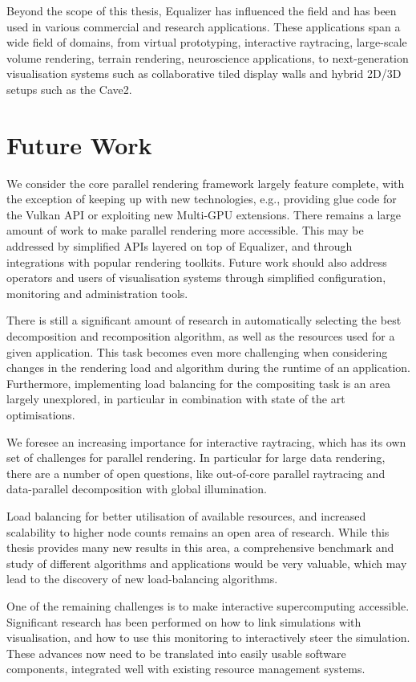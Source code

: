 Beyond the scope of this thesis, Equalizer has influenced the field and has
been used in various commercial and research applications. These applications
span a wide field of domains, from virtual prototyping, interactive raytracing,
large-scale volume rendering, terrain rendering, neuroscience applications, to
next-generation visualisation systems such as collaborative tiled display walls
and hybrid 2D/3D setups such as the Cave2.

\section{Future Work}

We consider the core parallel rendering framework largely feature complete,
with the exception of keeping up with new technologies, e.g., providing glue
code for the Vulkan API or exploiting new Multi-GPU extensions. There remains a
large amount of work to make parallel rendering more accessible. This may be
addressed by simplified APIs layered on top of Equalizer, and through
integrations with popular rendering toolkits. Future work should also address
operators and users of visualisation systems through simplified configuration,
monitoring and administration tools.

There is still a significant amount of research in automatically selecting the
best decomposition and recomposition algorithm, as well as the resources used
for a given application. This task becomes even more challenging when
considering changes in the rendering load and algorithm during the runtime of
an application. Furthermore, implementing load balancing for the compositing
task is an area largely unexplored, in particular in combination with state of
the art optimisations.

We foresee an increasing importance for interactive raytracing, which has its
own set of challenges for parallel rendering. In particular for large data
rendering, there are a number of open questions, like out-of-core parallel
raytracing and data-parallel decomposition with global illumination.

Load balancing for better utilisation of available resources, and increased
scalability to higher node counts remains an open area of research. While this
thesis provides many new results in this area, a comprehensive benchmark and
study of different algorithms and applications would be very valuable,
which may lead to the discovery of new load-balancing algorithms.

One of the remaining challenges is to make interactive supercomputing
accessible. Significant research has been performed on how to link simulations
with visualisation, and how to use this monitoring to interactively steer the
simulation. These advances now need to be translated into easily usable
software components, integrated well with existing resource management systems.
